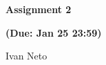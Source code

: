 \documentclass{article}
\begin{document}
\rhead{\thepage}

\pagestyle{fancy}

\cfoot{}

\begin{center}

\large{\textbf{Assignment 2}}

\textbf{(Due: Jan 25 23:59)}

Ivan Neto

\end{center}

\vskip 0.2in





\newpage




\end{document}
